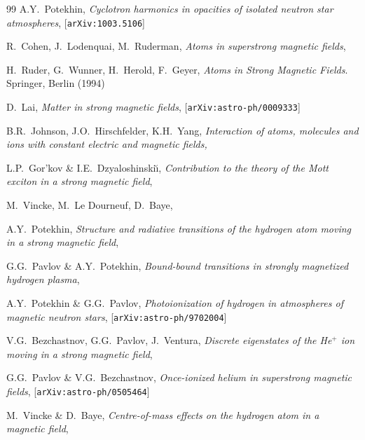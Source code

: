 \documentclass{pos1}
\begin{document}
\begin{thebibliography}{99}
A.Y.~Potekhin,
\textit{Cyclotron harmonics in opacities of isolated neutron star atmospheres},
[\texttt{arXiv:1003.5106}]

R.~Cohen, J.~Lodenquai, M.~Ruderman,
\textit{Atoms in superstrong magnetic fields},

H.~Ruder, G.~Wunner, H.~Herold, F.~Geyer,
\textit{Atoms in Strong Magnetic Fields}.
Springer, Berlin (1994)

D.~Lai,
\textit{Matter in strong magnetic fields},
[\texttt{arXiv:astro-ph/0009333}]

B.R.~Johnson, J.O.~Hirschfelder, K.H.~Yang,
\textit{Interaction of atoms, molecules and ions with constant electric and magnetic fields,} 

L.P.~Gor'kov \& I.E.~Dzyaloshinski\u{\i},
\textit{Contribution to the theory of the Mott exciton in a strong magnetic field},

M.~Vincke, M.~Le Dourneuf, D.~Baye,

A.Y.~Potekhin,
\textit{Structure and radiative transitions of the hydrogen atom moving in a strong magnetic field},

G.G.~Pavlov \& A.Y.~Potekhin,
\textit{Bound-bound transitions in strongly magnetized hydrogen plasma},

A.Y.~Potekhin \& G.G.~Pavlov,
\textit{Photoionization of hydrogen in atmospheres of magnetic neutron stars},
[\texttt{arXiv:astro-ph/9702004}]

V.G.~Bezchastnov, G.G.~Pavlov, J.~Ventura,
\textit{Discrete eigenstates of the He$^+$ ion moving in a strong magnetic field},

G.G.~Pavlov \& V.G.~Bezchastnov,
\textit{Once-ionized helium in superstrong magnetic fields},
[\texttt{arXiv:astro-ph/0505464}]

M.~Vincke \& D.~Baye,
\textit{Centre-of-mass effects on the hydrogen atom in a magnetic field},


\end{thebibliography}
\end{document}
